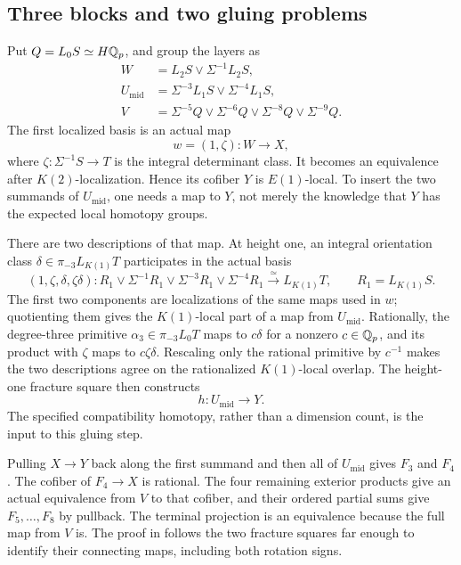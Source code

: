 \subsection{Three blocks and two gluing problems}

Put \(Q=L_0S\simeq H\mathbb Q_p\), and group the layers as
\[
\begin{aligned}
 W&=L_2S\vee\Sigma^{-1}L_2S,\\
 U_{\mathrm{mid}}&=\Sigma^{-3}L_1S\vee\Sigma^{-4}L_1S,\\
 V&=\Sigma^{-5}Q\vee\Sigma^{-6}Q
       \vee\Sigma^{-8}Q\vee\Sigma^{-9}Q.
\end{aligned}
\]
The first localized basis is an actual map
\[
 w=(1,\zeta):W\longrightarrow X,
\]
where \(\zeta:\Sigma^{-1}S\to T\) is the integral determinant
class.  It becomes an equivalence after \(K(2)\)-localization.
Hence its cofiber \(Y\) is \(E(1)\)-local.  To insert the two
summands of \(U_{\mathrm{mid}}\), one needs a map to \(Y\), not merely the
knowledge that \(Y\) has the expected local homotopy groups.

There are two descriptions of that map.  At height one, an integral
orientation class \(\delta\in\pi_{-3}L_{K(1)}T\) participates in
the actual basis
\[
 (1,\zeta,\delta,\zeta\delta):
 R_1\vee\Sigma^{-1}R_1\vee\Sigma^{-3}R_1\vee\Sigma^{-4}R_1
 \xrightarrow{\simeq}L_{K(1)}T,\qquad R_1=L_{K(1)}S.
\]
The first two components are localizations of the same maps used
in \(w\); quotienting them gives the \(K(1)\)-local part of a map
from \(U_{\mathrm{mid}}\).  Rationally, the degree-three primitive
\(\alpha_3\in\pi_{-3}L_0T\) maps to \(c\delta\) for a nonzero
\(c\in\mathbb Q_p\), and its product with \(\zeta\) maps to
\(c\zeta\delta\).  Rescaling only the rational primitive by
\(c^{-1}\) makes the two descriptions agree on the rationalized
\(K(1)\)-local overlap.  The height-one fracture square then
constructs
\[
 h:U_{\mathrm{mid}}\longrightarrow Y.
\]
The specified compatibility homotopy, rather than a dimension count,
is the input to this gluing step.

Pulling \(X\to Y\) back along the first summand and then all of \(U_{\mathrm{mid}}\)
gives \(F_3\) and \(F_4\).  The cofiber of \(F_4\to X\) is rational.
The four remaining exterior products give an actual equivalence
from \(V\) to that cofiber, and their ordered partial sums give
\(F_5,\ldots,F_8\) by pullback.  The terminal projection is an
equivalence because the full map from \(V\) is.  The proof in
 follows the two fracture squares far enough to
identify their connecting maps, including both rotation signs.


